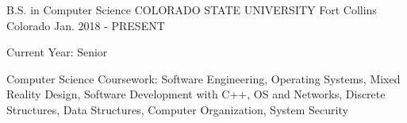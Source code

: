 

\begin{cventries}

  \cventry
    {B.S. in Computer Science} %
    {COLORADO STATE UNIVERSITY} %
    {Fort Collins Colorado} %
    {Jan. 2018 - PRESENT} %
    {
      \begin{cvitems} %
        \item {Current Year: Senior}
        \item {Computer Science Coursework:  Software Engineering, Operating Systems, Mixed Reality Design, Software Development with C++, OS and Networks, Discrete Structures, Data Structures, Computer Organization, System Security}
      \end{cvitems}
    }

\end{cventries}
